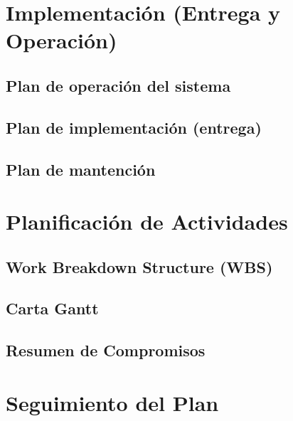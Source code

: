 \documentclass[letterpaper,spanish,10pt]{article}
\begin{document}
\newpage
\section{Implementaci\'on (Entrega y Operaci\'on)} %
\subsection{Plan de operaci\'on del sistema}



\subsection{Plan de implementaci\'on (entrega)}



\subsection{Plan de mantenci\'on}



\newpage
\section{Planificaci\'on de Actividades} %
\subsection{Work Breakdown Structure (WBS)}



\subsection{Carta Gantt}



\subsection{Resumen de Compromisos}



\newpage
\section{Seguimiento del Plan} %
\end{document}
